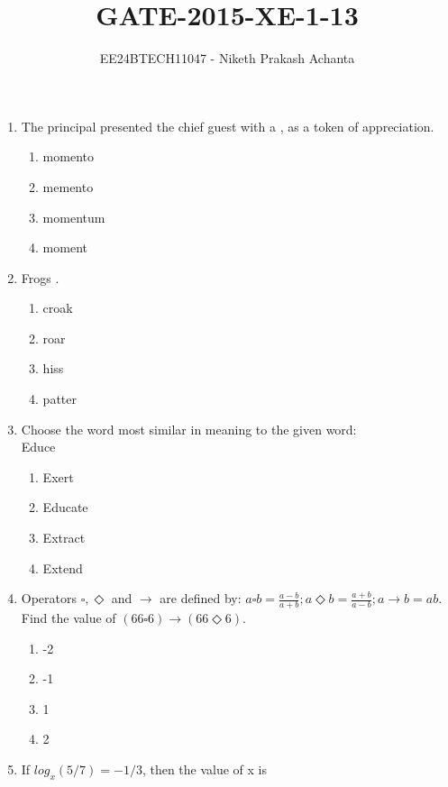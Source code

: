 \documentclass[journal]{IEEEtran}
\numberwithin{equation}{enumi}
\numberwithin{figure}{enumi}
\begin{document}

\vspace{3cm}

\title{GATE-2015-XE-1-13}
\author{EE24BTECH11047 - Niketh Prakash Achanta}
{\let\newpage\relax\maketitle}

\begin{enumerate}[start=1]
\item The principal presented the chief guest with a \underline{\hspace{1cm}}, as a token of appreciation.
\begin{enumerate}
    \item momento
    \item memento
    \item momentum
    \item moment
\end{enumerate}
\item Frogs \underline{\hspace{1cm}}.
\begin{enumerate}
    \item croak
    \item roar
    \item hiss
    \item patter
\end{enumerate}
\item Choose the word most similar in meaning to the given word:\\
Educe
\begin{enumerate}
    \item Exert
    \item Educate
    \item Extract
    \item Extend
\end{enumerate}
\item Operators $\square, \Diamond$ and $\rightarrow$ are defined by: $a\square b=\frac{a-b}{a+b};a\Diamond b=\frac{a+b}{a-b};a\rightarrow b=ab$. Find the value of $(66\square 6)\rightarrow(66\Diamond 6)$.
\begin{enumerate}
    \item -2
    \item -1
    \item 1
    \item 2
\end{enumerate}
\item If $log_{x}(5/7)=-1/3$, then the value of x is

\end{enumerate}
\end{document}
